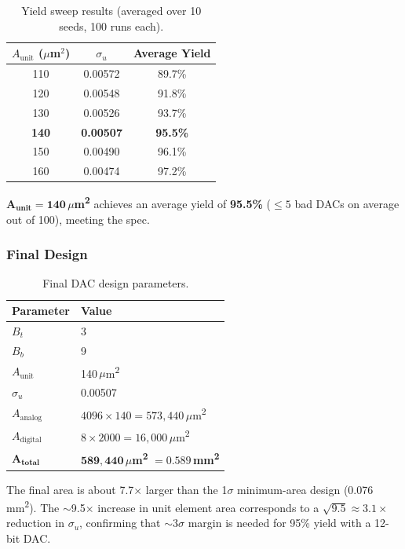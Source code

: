 \documentclass{article}
\begin{document}
\begin{table}[H]
\centering
\caption{Yield sweep results (averaged over 10 seeds, 100 runs each).}
\begin{tabular}{@{}ccc@{}}
\toprule
$A_\text{unit}$ ($\mu$m$^2$) & $\sigma_u$ & Average Yield \\
\midrule
110 & 0.00572 & 89.7\% \\
120 & 0.00548 & 91.8\% \\
130 & 0.00526 & 93.7\% \\
\textbf{140} & \textbf{0.00507} & \textbf{95.5\%} \\
150 & 0.00490 & 96.1\% \\
160 & 0.00474 & 97.2\% \\
\bottomrule
\end{tabular}
\label{tab:yield_sweep}
\end{table}

$\mathbf{A_\text{unit} = 140}$\,$\mu$\textbf{m}\textsuperscript{\textbf{2}} achieves an average yield of \textbf{95.5\%} ($\leq 5$ bad DACs on average out of 100), meeting the spec.

\subsubsection{Final Design}

\begin{table}[H]
\centering
\caption{Final DAC design parameters.}
\begin{tabular}{@{}ll@{}}
\toprule
Parameter & Value \\
\midrule
$B_t$ & 3 \\
$B_b$ & 9 \\
$A_\text{unit}$ & 140\,$\mu$m\textsuperscript{2} \\
$\sigma_u$ & 0.00507 \\
$A_\text{analog}$ & $4096 \times 140 = 573{,}440$\,$\mu$m\textsuperscript{2} \\
$A_\text{digital}$ & $8 \times 2000 = 16{,}000$\,$\mu$m\textsuperscript{2} \\
\midrule
$\mathbf{A_\text{total}}$ & $\mathbf{589{,}440}$\,$\mu$\textbf{m}\textsuperscript{\textbf{2}} $\mathbf{= 0.589}$\,\textbf{mm}\textsuperscript{\textbf{2}} \\
\bottomrule
\end{tabular}
\end{table}

The final area is about 7.7$\times$ larger than the 1$\sigma$ minimum-area design (0.076\,mm\textsuperscript{2}). The $\sim$9.5$\times$ increase in unit element area corresponds to a $\sqrt{9.5} \approx 3.1\times$ reduction in $\sigma_u$, confirming that $\sim$3$\sigma$ margin is needed for 95\% yield with a 12-bit DAC.
\end{document}
